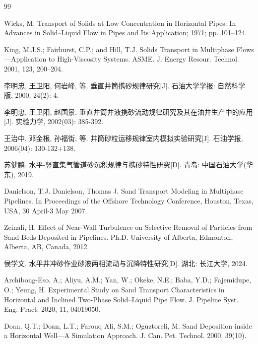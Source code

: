 \clearpage %

\begin{thebibliography}{99}

Wicks, M. Transport of Solids at Low Concentration in Horizontal Pipes. In Advances in Solid–Liquid Flow in Pipes and Its Application; 1971; pp. 101–124.

King, M.J.S.; Fairhurst, C.P.; and Hill, T.J. Solids Transport in Multiphase Flows—Application to High-Viscosity Systems. ASME. J. Energy Resour. Technol. 2001, 123, 200–204. 


李明忠, 王卫阳, 何岩峰, 等. 垂直井筒携砂规律研究[J]. 石油大学学报: 自然科学版, 2000, 24(2): 4.


李明忠, 王卫阳, 赵国景. 垂直井筒井液携砂流动规律研究及其在油井生产中的应用[J]. 实验力学, 2002(03): 385-392.


王治中, 邓金根, 孙福街, 等. 井筒砂粒运移规律室内模拟实验研究[J]. 石油学报, 2006(04): 130-132+138.


苏健鹏. 水平-竖直集气管道砂沉积规律与携砂特性研究[D]. 青岛: 中国石油大学(华东), 2019.


Danielson, T.J. Danielson, Thomas J. Sand Transport Modeling in Multiphase Pipelines. In Proceedings of the Offshore Technology Conference, Houston, Texas, USA, 30 April-3 May 2007. 


Zeinali, H. Effect of Near-Wall Turbulence on Selective Removal of Particles from Sand Beds Deposited in Pipelines. Ph.D. University of Alberta, Edmonton, Alberta, AB, Canada, 2012.


侯学文. 水平井冲砂作业砂液两相流动与沉降特性研究[D]. 湖北: 长江大学, 2024.


Archibong-Eso, A.; Aliyu, A.M.; Yan, W.; Okeke, N.E.; Baba, Y.D.; Fajemidupe, O.; Yeung, H. Experimental Study on Sand Transport Characteristics in Horizontal and Inclined Two-Phase Solid–Liquid Pipe Flow. J. Pipeline Syst. Eng. Pract. 2020, 11, 04019050.


Doan, Q.T.; Doan, L.T.; Farouq Ali, S.M.; Oguztoreli, M. Sand Deposition inside a Horizontal Well—A Simulation Approach. J. Can. Pet. Technol. 2000, 39(10).



\end{thebibliography}
